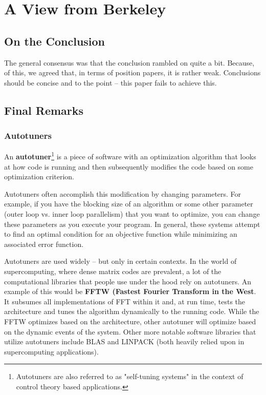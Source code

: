 



\section{A View from Berkeley}

\subsection{On the Conclusion}

The general consensus was that the conclusion rambled on quite a bit. Because, of this, we agreed that, in terms of position papers, it is rather weak. Conclusions should be concise and to the point -- this paper fails to achieve this. 

\subsection{Final Remarks}

\subsubsection{Autotuners}

An \textbf{autotuner}\footnote{Autotuners are also referred to as "self-tuning systems" in the context of control theory based applications.} is a piece of software with an optimization algorithm that looks at how code is running and then subsequently modifies the code based on some optimization criterion.

Autotuners often accomplish this modification by changing parameters. For example, if you have the blocking size of an algorithm or some other parameter (outer loop vs. inner loop parallelism) that you want to optimize, you can change these parameters as you execute your program. In general, these systems attempt to find an optimal condition for an objective function while minimizing an associated error function.

Autotuners are used widely -- but only in certain contexts. In the world of supercomputing, where dense matrix codes are prevalent, a lot of the computational libraries that people use under the hood rely on autotuners. An example of this would be \textbf{FFTW (Fastest Fourier Transform in the West}. It subsumes all implementations of FFT within it and, at run time, tests the architecture and tunes the algorithm dynamically to the running code. While the FFTW optimizes based on the architecture, other autotuner will optimize based on the dynamic events of the system. Other more notable software libraries that utilize autotuners include BLAS and LINPACK (both heavily relied upon in supercomputing applications).


